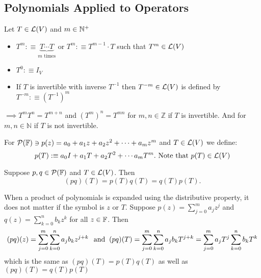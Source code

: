 \subsection{Polynomials Applied to Operators}

\setcounter{thm}{12}
\begin{mydef} [notation $T^m$]
  Let $T \in \mathcal{L}(V)$ and $m\in \mathbb{N}^{+}$
  \begin{itemize}
    \item $T^{m} :\equiv \underbrace{T \cdots T}_{\text{$m$ times}}$ or $T^{m} :\equiv T^{m-1} \cdot T$ such that $T^{m} \in \mathcal{L}(V)$
    \item $T^0 :\equiv I_V$
    \item If $T$ is invertible with inverse $T^{-1}$ then $T^{-m}\in \mathcal{L}(V)$ is defined by $T^{-m} :\equiv (T^{-1})^m$
  \end{itemize}
\end{mydef}
$\implies T^m T^n = T^{m+n}$ and $(T^m)^n=T^{mn}$ for $m,n \in \mathbb{Z}$ if $T$ is invertible. And for $m,n \in \mathbb{N}$ if $T$ is not invertible.

\begin{mydef} [notation $p(T)$]
  For $\mathcal{P} (\mathbb{F}) \ni p(z) = a_0+a_1z+a_2z^2+\cdots+a_mz^m$
 and
  $T \in \mathcal{L} (V)$ we define:
  \begin{equation}
    p(T) :\equiv a_0 I + a_1 T + a_2 T^2 + \cdots a_m T^m.$ Note that $p(T) \in \linmap(V)
  \end{equation}
\end{mydef}



\setcounter{thm}{16}
\begin{thm} 
  \label{multiplicative-properties}
  Suppose $p,q \in \mathcal{P} (\mathbb{F})$ and $T\in \mathcal{L} (V)$. Then \begin{equation}
    (p q)(T) = p(T) q(T) = q(T)p(T).
  \end{equation}
\end{thm}
\begin{prf} When a product of polynomials is expanded using the distributive property, it does not matter if the symbol is $z$ or $T$. Suppose $p(z) = \sum_{j=0}^{m} a_j z^j$ and $q(z)=\sum_{k=0}^{n} b_k z^k$ for all $z \in \mathbb{F}$. Then  %
  \begin{equation}
    (pq)(z) = \sum_{j=0}^{m} \sum_{k=0}^{n} a_j b_k z^{j+k} \;\;\, \text{and}\;\;
    (pq)(T) = \sum_{j=0}^{m} \sum_{k=0}^{n} a_j b_k T^{j+k}
    = \sum_{j=0}^{m} a_j T^j \sum_{k=0}^{n}  b_k T^k
  \end{equation}
  which is the same as $(pq)(T) = p(T)q(T)$ as well as $(pq)(T) = q(T)p(T)$
\end{prf}

